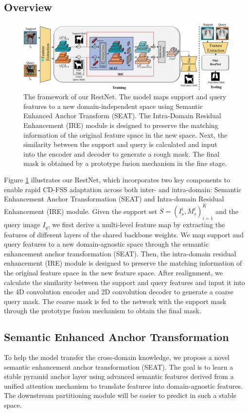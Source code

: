 \documentclass{bmvc2k}
\begin{document}
\subsection{Overview}
\begin{figure}[t]
\centering
\includegraphics[scale=0.19]{images/overview.png}
\caption{The framework of our RestNet.
The model maps support and query features to a new domain-independent space using Semantic Enhanced Anchor Transform (SEAT). The Intra-Domain Residual Enhancement (IRE) module is designed to preserve the matching information of the original feature space in the new space. Next, the similarity between the support and query is calculated and input into the encoder and decoder to generate a rough mask. The final mask is obtained by a prototype fusion mechanism in the fine stage.}
\label{overimg}
\end{figure}

Figure \ref{overimg} illustrates our RestNet, which incorporates two key components to enable rapid CD-FSS adaptation across both inter- and intra-domain: Semantic Enhancement Anchor Transformation (SEAT) and Intra-domain Residual Enhancement (IRE) module.
Given the support set $S = {(I^i_s, M^i_s)}^K_{i = 1}$ and the query image $I_q$, we first derive a multi-level feature map by extracting the features of different layers of the shared backbone weights. 
We map support and query features to a new domain-agnostic space through the semantic enhancement anchor transformation (SEAT).
Then, the intra-domain residual enhancement (IRE) module is designed to preserve the matching information of the original feature space in the new feature space. 
After realignment, we calculate the similarity between the support and query features and input it into the 4D convolution encoder and 2D convolution decoder \cite{min2021hypercorrelation} to generate a coarse query mask.
The coarse mask is fed to the network with the support mask through the prototype fusion mechanism to obtain the final mask.
\subsection{Semantic Enhanced Anchor Transformation}\label{SEAT}
To help the model transfer the cross-domain knowledge, we propose a novel semantic enhancement anchor transformation (SEAT).
The goal is to learn a stable pyramid anchor layer using advanced semantic features derived from a unified attention mechanism to translate features into domain-agnostic features. 
The downstream partitioning module will be easier to predict in such a stable space.
\end{document}
